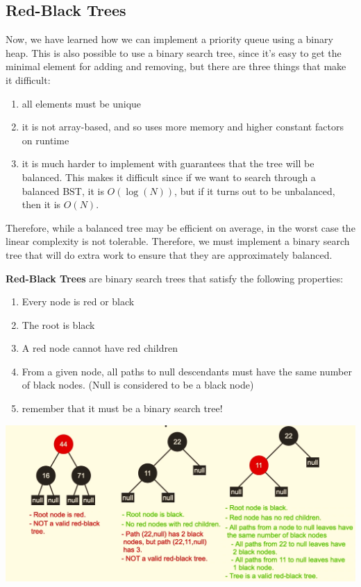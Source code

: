 \documentclass{article}
\begin{document}
  \subsection{Red-Black Trees}

    Now, we have learned how we can implement a priority queue using a binary heap. This is also possible to use a binary search tree, since it's easy to get the minimal element for adding and removing, but there are three things that make it difficult: 
    \begin{enumerate}
        \item all elements must be unique 
        \item it is not array-based, and so uses more memory and higher constant factors on runtime 
        \item it is much harder to implement with guarantees that the tree will be balanced. This makes it difficult since if we want to search through a balanced BST, it is $O(\log(N))$, but if it turns out to be unbalanced, then it is $O(N)$. 
    \end{enumerate}
    Therefore, while a balanced tree may be efficient on average, in the worst case the linear complexity is not tolerable. Therefore, we must implement a binary search tree that will do extra work to ensure that they are approximately balanced. 

    \begin{definition}
    \textbf{Red-Black Trees} are binary search trees that satisfy the following properties: 
    \begin{enumerate}
        \item Every node is red or black 
        \item The root is black 
        \item A red node cannot have red children 
        \item From a given node, all paths to null descendants must have the same number of black nodes. (Null is considered to be a black node)
        \item remember that it must be a binary search tree! 
    \end{enumerate}
    \begin{center}
        \includegraphics[scale=0.4]{img/red_black_trees.png}
    \end{center}
    \end{definition}
\end{document}
